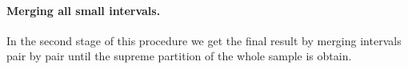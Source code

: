 \documentclass[12pt, a4paper]{article}
\numberwithin{equation}{section}
\begin{document}
%
%    
%      
%
%
%    
%      
%    
%    


\paragraph{Merging all small intervals.}
In the second stage of this procedure we get the final result by
merging intervals pair by pair until the supreme partition of the whole sample is obtain.
\end{document}
